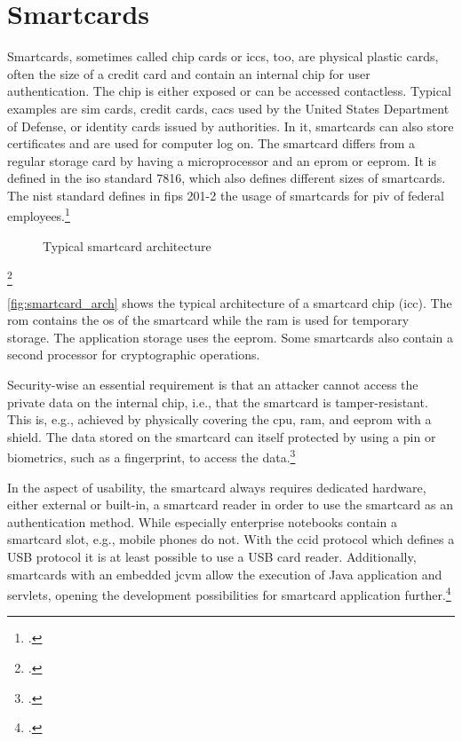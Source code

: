 \section{Smartcards}

Smartcards, sometimes called chip cards or \glspl{icc}, too, are physical plastic cards, often the size of a credit card and contain an internal chip for user authentication. The chip is either exposed or can be accessed contactless. Typical examples are \gls{sim} cards, credit cards, \glspl{cac} used by the United States Department of Defense, or identity cards issued by authorities. In \gls{it}, smartcards can also store certificates and are used for computer log on. The smartcard differs from a regular storage card by having a microprocessor and an \gls{eprom} or \gls{eeprom}. It is defined in the \gls{iso} standard 7816, which also defines different sizes of smartcards. The \gls{nist} standard defines in \gls{fips} 201-2 the usage of smartcards for \gls{piv} of federal employees.\footcites[See][525--527]{eckert-it-sec-9}[See][]{iso7816}[See][6--9]{1698485}[See][]{FIPS201-2}


\begin{figure}[hbt]
	\centering
	
	\caption[Typical smartcard architecture]{Typical smartcard architecture\footnotemark}
	\label{fig:smartcard_arch}
\end{figure}
\footcitetexts[Source: diagram by author, based on][33]{electronic_certification_mobile_devices}[][228]{1698485}

\autoref{fig:smartcard_arch} shows the typical architecture of a smartcard chip (\gls{icc}). The \gls{rom} contains the \gls{os} of the smartcard while the \gls{ram} is used for temporary storage. The application storage uses the \gls{eeprom}. Some smartcards also contain a second processor for cryptographic operations.

Security-wise an essential requirement is that an attacker cannot access the private data on the internal chip, i.e., that the smartcard is tamper-resistant. This is, e.g., achieved by physically covering the \gls{cpu}, \gls{ram}, and \gls{eeprom} with a shield. The data stored on the smartcard can itself protected by using a \gls{pin} or biometrics, such as a fingerprint, to access the data.\footcites[See][34]{265831}[See][228]{1698485}

In the aspect of usability, the smartcard always requires dedicated hardware, either external or built-in, a smartcard reader in order to use the smartcard as an authentication method. While especially enterprise notebooks contain a smartcard slot, e.g., mobile phones do not. With the \gls{ccid} protocol which defines a USB protocol it is at least possible to use a USB card reader. Additionally, smartcards with an embedded \gls{jcvm} allow the execution of Java application and servlets, opening the development possibilities for smartcard application further.\footcites[See][65]{1698485}[See][539]{eckert-it-sec-9}